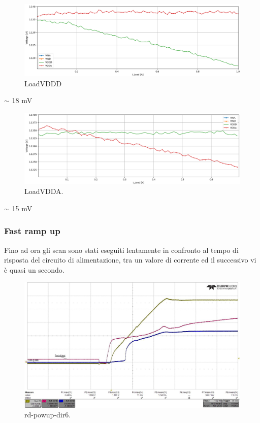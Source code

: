 \begin{figure}
\centering
\includegraphics[scale=.3]{Immagini/LoadVDDD}
\caption{LoadVDDD}
\label{LoadVDDD}
\end{figure}
$\sim$ 18 mV
\begin{figure}
\centering
\includegraphics[scale=.3]{Immagini/LoadVDDA}
\caption{LoadVDDA.}
\label{LoadVDDA}
\end{figure}
$\sim$ 15 mV
\afterpage{\clearpage}


\subsubsection{Fast ramp up}
Fino ad ora gli scan sono stati eseguiti lentamente in confronto al tempo di risposta del circuito di alimentazione, tra un valore di corrente ed il successivo vi è quasi un secondo.
\begin{figure}
\centering
\includegraphics[scale=.3]{Immagini/rd-powup-dir6}
\caption{rd-powup-dir6.}
\label{rd-powup-dir6}
\end{figure}

